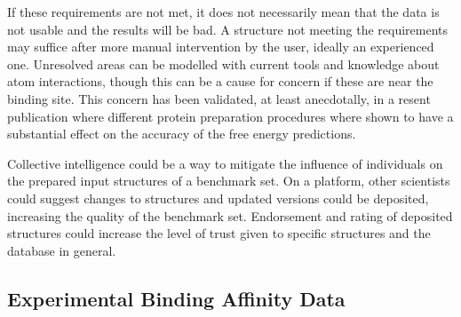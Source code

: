\documentclass[9pt,bestpractices]{livecoms}
\begin{document}
%
If these requirements are not met, it does not necessarily mean that the data is not usable and the results will be bad. A structure not meeting the requirements may suffice after more manual intervention by the user, ideally an experienced one. Unresolved areas can be modelled with current tools and knowledge about atom interactions, though this can be a cause for concern if these are near the binding site. This concern has been validated, at least anecdotally, in a resent publication where different protein preparation procedures where shown to have a substantial effect on the accuracy of the free energy predictions.~\cite{shih_impact_2020}


Collective intelligence could be a way to mitigate the influence of individuals on the prepared input structures of a benchmark set. On a platform, other scientists could suggest changes to structures and updated versions could be deposited, increasing the quality of the benchmark set. Endorsement and rating of deposited structures could increase the level of trust given to specific structures and the database in general.


\subsection{Experimental Binding Affinity Data}
\label{sec:affinities}
\end{document}
